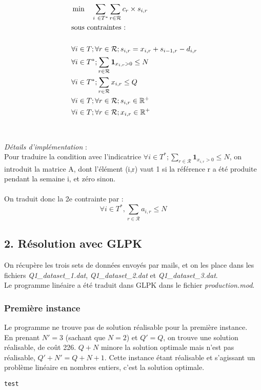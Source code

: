 \documentclass{rapport}
\begin{document}
\begin{equation*}
\begin{aligned}
& \min \ \ \  \sum_{i \in T^*} \sum_{r \in \mathcal{R}} c_r \times s_{i, r} \\
& \text{sous contraintes : } \\
\ \\
& \forall i \in T; \forall r \in \mathcal{R}; s_{i,r} = x_{i,r} + s_{i-1,r} - d_{i, r}\\
& \forall i \in T^*; \sum_{r \in \mathcal{R}} \mathbf{1}_{x_{i, r} > 0} \le N \\
& \forall i \in T^*; \sum_{r \in \mathcal{R}} x_{i, r} \le Q \\
& \forall i \in T; \forall r \in \mathcal{R}; s_{i, r} \in \R^+ \\
& \forall i \in T; \forall r \in \mathcal{R}; x_{i, r} \in \R^+
\end{aligned}
\end{equation*}
\ \\
\ \\
\emph{Détails d'implémentation} : \\
Pour traduire la condition avec l'indicatrice $\forall i \in T^*; \sum_{r \in \mathcal{R}} \mathbf{1}_{x_{i, r} > 0} \le N$, on introduit la matrice A, dont l'élément (i,r) vaut 1 si la référence r a été produite pendant la semaine i, et zéro sinon. \\
\ \\
On traduit donc la 2e contrainte par :
$$\forall i \in T^*, \sum_{r \in \mathcal{R}}a_{i,r} \le N $$


\subsection{2. Résolution avec GLPK}
On récupère les trois sets de données envoyés par mails, et on les place dans les fichiers \emph{Q1\_dataset\_1.dat}, \emph{Q1\_dataset\_2.dat} et \emph{Q1\_dataset\_3.dat}. \\
Le programme linéaire a été traduit dans GLPK dans le fichier \emph{production.mod}.
\ \\
\subsubsection{Première instance}
Le programme ne trouve pas de solution réalisable pour la première instance. \ \\
En prenant $N'=3$ (sachant que $N=2$) et $Q'=Q$, on trouve une solution réalisable, de coût 226. $Q+N$ minore la solution optimale mais n'est pas réalisable, $Q'+N'=Q+N+1$. Cette instance étant réalisable et s'agissant un problème linéaire en nombres entiers, c'est la solution optimale. \\




\begin{lstlisting}
test
\end{lstlisting}
\end{document}

